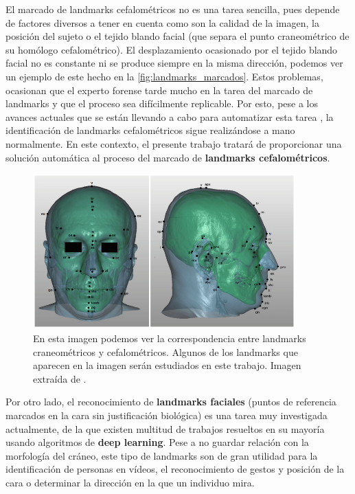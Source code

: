     \noindent El marcado de landmarks cefalométricos no es una tarea sencilla, pues depende de factores diversos a tener en cuenta como son la calidad de la imagen, la posición del sujeto o el tejido blando facial (que separa el punto craneométrico de su homólogo cefalométrico). El desplazamiento ocasionado por el tejido blando facial no es constante ni se produce siempre en la misma dirección, podemos ver un ejemplo de este hecho en la \autoref{fig:landmarks_marcados}. Estos problemas, ocasionan que el experto forense tarde mucho en la tarea del marcado de landmarks y que el proceso sea difícilmente replicable. Por esto, pese a los avances actuales que se están llevando a cabo para automatizar esta tarea \cite{Huete2015PastPA}, la identificación de landmarks cefalométricos sigue realizándose a mano normalmente. En este contexto, el presente trabajo tratará de proporcionar una solución automática al proceso del marcado de \textbf{landmarks cefalométricos}.


    \begin{figure}[!h]
        \centering
        \includegraphics[width=0.9\textwidth]{img/marcado_landmarks.png}
        \caption{En esta imagen podemos ver la correspondencia entre landmarks craneométricos y cefalométricos. Algunos de los landmarks que aparecen en la imagen serán estudiados en este trabajo. Imagen extraída de \cite{damas2020handbook}.}
        \label{fig:landmarks_marcados}
    \end{figure}

    \medskip 

    \noindent Por otro lado, el reconocimiento de \textbf{landmarks faciales} (puntos de referencia marcados en la cara sin justificación biológica) es una tarea muy investigada actualmente, de la que existen  multitud de trabajos resueltos en su mayoría usando algoritmos de \textbf{deep learning}. Pese a no guardar relación con la morfología del cráneo, este tipo de landmarks son de gran utilidad para la identificación de personas en vídeos, el reconocimiento de gestos y posición de la cara o determinar la dirección en la que un individuo mira. 
    
